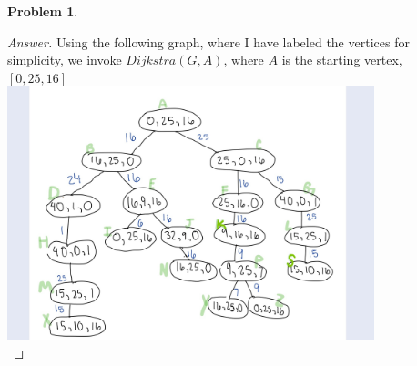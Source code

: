 \documentclass[11pt]{article}
\theoremstyle{definition}
\theoremstyle{definition}
\newtheorem{required}{Problem}
\theoremstyle{definition}
\begin{document}
\begin{required}
\begin{enumerate}[label=(\alph*)]
\begin{proof}[Answer]
Using the following graph, where I have labeled the vertices for simplicity, we invoke $Dijkstra(G, A)$, where $A$ is the starting vertex, $[0,25,16]$ \\
 \includegraphics[width=0.8\textwidth]{hw2problem6c} \\


\end{proof}
\end{enumerate}
\end{required}
\end{document}
